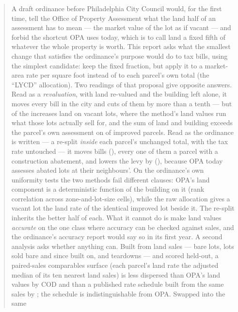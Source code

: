 \documentclass[11pt]{article}
\begin{document}
\begin{abstract}
\noindent A draft ordinance before Philadelphia City Council would, for the first time, tell
the Office of Property Assessment what the land half of an assessment has to mean --- the
market value of the lot as if vacant --- and forbid the shortcut OPA uses today, which is to
call land a fixed fifth of whatever the whole property is worth. This report asks what the
smallest change that satisfies the ordinance's purpose would do to tax bills, using the
simplest candidate: keep the fixed fraction, but apply it to a market-area rate per square
foot instead of to each parcel's own total (the ``LYCD'' allocation). Two readings of that
proposal give opposite answers. Read as a \emph{revaluation}, with land re-valued and the
building left alone, it moves every bill in the city and cuts \LycdADownTenPct{} of them by
more than a tenth --- but \LycdAVacantShareOfShift{} of the increases land on vacant lots, where the method's
land values run \LycdSalesLYCDAgg{} what those lots actually sell for, and the sum of land and
building exceeds the parcel's own assessment on \LycdAOvershootPct{} of improved parcels. Read
as the ordinance is written --- a re-split \emph{inside} each parcel's unchanged total, with
the tax rate untouched --- it moves \LycdCMoved{} bills (\LycdCMovedPct{}), every one of them a
parcel with a construction abatement, and lowers the levy by \LycdCLevyAbsM{} (\LycdCLevyPct{}),
because OPA today assesses abated lots at \LycdUniOPAAbatedRatio{} their neighbours'. On the
ordinance's own uniformity tests the two methods fail different clauses: OPA's land component
is a deterministic function of the building on it (rank correlation \LycdUniOPABuildingCorr{}
across \LycdUniCells{} zone-and-lot-size cells), while the raw allocation gives a vacant lot
\LycdUniLYCDVacantImprovedRatio{} the land rate of the identical improved lot beside it. The
re-split inherits the better half of each. What it cannot do is make land values \emph{accurate}
on the one class where accuracy can be checked against sales, and the ordinance's accuracy
report would say so in its first year. A second analysis asks whether anything can. Built from
\LycdWitN{} land sales --- bare lots, lots sold bare and since built on, and teardowns --- and
scored held-out, a paired-sales comparables surface (each parcel's land rate the adjusted
median of its ten nearest land sales) is less dispersed than OPA's land values by
\LycdSfiveVsSzeroDiffAbs{} COD and than a published rate schedule built from the same sales by
\LycdSfiveVsSthreeDiffAbs{}; the schedule is indistinguishable from OPA. Swapped into the same

\end{abstract}
\end{document}
